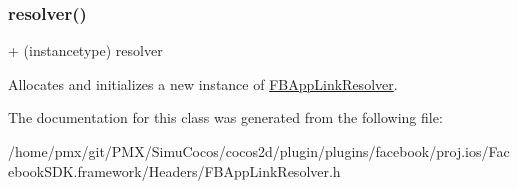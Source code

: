 \subsubsection{\texorpdfstring{resolver()}{resolver()}\hspace{0.1cm}{\footnotesize\ttfamily [5/5]}}
{\footnotesize\ttfamily + (instancetype) resolver \begin{DoxyParamCaption}{ }\end{DoxyParamCaption}}

Allocates and initializes a new instance of \hyperlink{interfaceFBAppLinkResolver}{F\+B\+App\+Link\+Resolver}. 

The documentation for this class was generated from the following file\+:\begin{DoxyCompactItemize}
\item 
/home/pmx/git/\+P\+M\+X/\+Simu\+Cocos/cocos2d/plugin/plugins/facebook/proj.\+ios/\+Facebook\+S\+D\+K.\+framework/\+Headers/F\+B\+App\+Link\+Resolver.\+h\end{DoxyCompactItemize}
